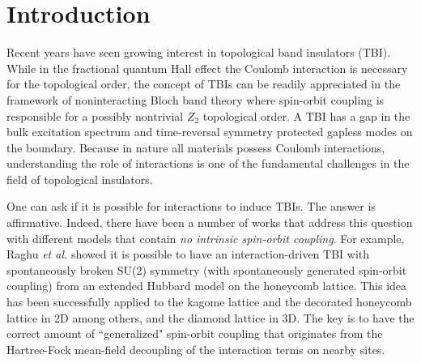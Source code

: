 \documentclass[aps,prb,twocolumn,superscriptaddress,showpacs]{revtex4-1}
\begin{document}
\section{Introduction}
Recent years have seen growing interest in topological band insulators (TBI).\cite{Kane:rmp10,Moore:nat10,Zhang:pt10} While in the fractional quantum Hall effect the Coulomb interaction is necessary for the topological order, the concept of TBIs can be readily appreciated in the framework of noninteracting Bloch band theory where spin-orbit coupling is responsible for a possibly nontrivial $Z_2$ topological order.\cite{Kane:rmp10,Moore:nat10,Zhang:pt10} A TBI has a gap in the bulk excitation spectrum and time-reversal symmetry protected gapless modes on the boundary. Because in nature all materials possess Coulomb interactions, understanding the role of  interactions is one of the fundamental challenges in the field of topological insulators.

One can ask if it is possible for interactions to induce TBIs. The answer is affirmative. Indeed, there have been a number of works that address this question with different models that contain {\em no intrinsic spin-orbit coupling}. For example, Raghu \emph{et al.}\cite{Raghu:prl08}  showed it is possible to have an interaction-driven TBI with spontaneously broken SU(2) symmetry (with spontaneously generated spin-orbit coupling) from an extended Hubbard model on the honeycomb lattice.  This idea has been successfully applied to the kagome lattice\cite{Wen:prb10}  and the decorated honeycomb lattice\cite{Wen:prb10} in 2D  among others,\cite{Sun:prl09,Yi:prb09,Liu:prb10,FZhang:prl11,Ruegg11_2,Wang11,Yang11} and the diamond lattice in 3D.\cite{Yi:prb09} The key is to have the correct amount of ``generalized" spin-orbit coupling that originates from the Hartree-Fock mean-field decoupling of the interaction terms on nearby sites.
\end{document}
